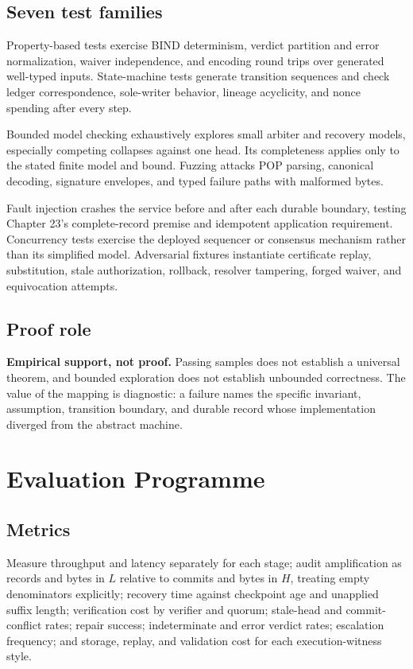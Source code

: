 \documentclass[11pt,openany]{book}
\begin{document}
\section{Seven test families}
Property-based tests exercise BIND determinism, verdict partition and error
normalization, waiver independence, and encoding round trips over generated
well-typed inputs. State-machine tests generate transition sequences and check
ledger correspondence, sole-writer behavior, lineage acyclicity, and nonce
spending after every step.

Bounded model checking exhaustively explores small arbiter and recovery models,
especially competing collapses against one head. Its completeness applies only
to the stated finite model and bound. Fuzzing attacks POP parsing, canonical
decoding, signature envelopes, and typed failure paths with malformed bytes.

Fault injection crashes the service before and after each durable boundary,
testing Chapter 23's complete-record premise and idempotent application
requirement. Concurrency tests exercise the deployed sequencer or consensus
mechanism rather than its simplified model. Adversarial fixtures instantiate
certificate replay, substitution, stale authorization, rollback, resolver
tampering, forged waiver, and equivocation attempts.

\section{Proof role}
\textbf{Empirical support, not proof.} Passing samples does not establish a
universal theorem, and bounded exploration does not establish unbounded
correctness. The value of the mapping is diagnostic: a failure names the
specific invariant, assumption, transition boundary, and durable record whose
implementation diverged from the abstract machine.

\chapter{Evaluation Programme}
\section{Metrics}
Measure throughput and latency separately for each stage; audit amplification
as records and bytes in \(L\) relative to commits and bytes in \(H\), treating
empty denominators explicitly; recovery time against checkpoint age and
unapplied suffix length; verification cost by verifier and quorum; stale-head
and commit-conflict rates; repair success; indeterminate and error verdict
rates; escalation frequency; and storage, replay, and validation cost for each
execution-witness style.
\end{document}
